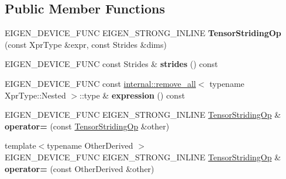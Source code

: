 \subsection*{Public Member Functions}
\begin{DoxyCompactItemize}
\item 
\mbox{\label{class_eigen_1_1_tensor_striding_op_a8680990e9016343ae59bcee7dae7b8e1}} 
E\+I\+G\+E\+N\+\_\+\+D\+E\+V\+I\+C\+E\+\_\+\+F\+U\+NC E\+I\+G\+E\+N\+\_\+\+S\+T\+R\+O\+N\+G\+\_\+\+I\+N\+L\+I\+NE {\bfseries Tensor\+Striding\+Op} (const Xpr\+Type \&expr, const Strides \&dims)
\item 
\mbox{\label{class_eigen_1_1_tensor_striding_op_a59900ba4516950cd185566e16233af0c}} 
E\+I\+G\+E\+N\+\_\+\+D\+E\+V\+I\+C\+E\+\_\+\+F\+U\+NC const Strides \& {\bfseries strides} () const
\item 
\mbox{\label{class_eigen_1_1_tensor_striding_op_a2a08564154c0867e3d3aaaaa7b1f90fc}} 
E\+I\+G\+E\+N\+\_\+\+D\+E\+V\+I\+C\+E\+\_\+\+F\+U\+NC const \hyperlink{struct_eigen_1_1internal_1_1remove__all}{internal\+::remove\+\_\+all}$<$ typename Xpr\+Type\+::\+Nested $>$\+::type \& {\bfseries expression} () const
\item 
\mbox{\label{class_eigen_1_1_tensor_striding_op_acc8d8f3210fb1aec8bb7b560489db228}} 
E\+I\+G\+E\+N\+\_\+\+D\+E\+V\+I\+C\+E\+\_\+\+F\+U\+NC E\+I\+G\+E\+N\+\_\+\+S\+T\+R\+O\+N\+G\+\_\+\+I\+N\+L\+I\+NE \hyperlink{class_eigen_1_1_tensor_striding_op}{Tensor\+Striding\+Op} \& {\bfseries operator=} (const \hyperlink{class_eigen_1_1_tensor_striding_op}{Tensor\+Striding\+Op} \&other)
\item 
\mbox{\label{class_eigen_1_1_tensor_striding_op_a15ecf899a28df80d1bd432e78ea4ba5b}} 
{\footnotesize template$<$typename Other\+Derived $>$ }\\E\+I\+G\+E\+N\+\_\+\+D\+E\+V\+I\+C\+E\+\_\+\+F\+U\+NC E\+I\+G\+E\+N\+\_\+\+S\+T\+R\+O\+N\+G\+\_\+\+I\+N\+L\+I\+NE \hyperlink{class_eigen_1_1_tensor_striding_op}{Tensor\+Striding\+Op} \& {\bfseries operator=} (const Other\+Derived \&other)
\item 
\mbox{\label{class_eigen_1_1_tensor_striding_op_a8680990e9016343ae59bcee7dae7b8e1}} 

\end{DoxyCompactItemize}
